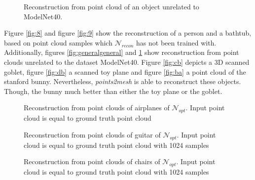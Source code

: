 \begin{figure}[htbp]
  \centering
  \caption{Reconstruction from point cloud of an object unrelated to ModelNet40.} \label{fig:bunny}
\end{figure}
  Figure \ref{fig:8} and figure \ref{fig:9} show the reconstruction of a person and a bathtub, based on point cloud samples 
  which $\mathcal{N}_{recon}$ has not been trained with. Additionally, figures \ref{fig:generalgeneral} and \ref{fig:bunny} show
  reconstruction from point clouds unrelated to the dataset ModelNet40. Figure \ref{fig:cb} depicts a 3D scanned goblet, figure \ref{fig:db} a scanned
  toy plane and figure \ref{fig:ba} a point cloud of the stanford bunny. Nevertheless, \emph{points2mesh} is able to reconstruct these objects. Though, the bunny much
  better than either the toy plane or the goblet.
\begin{figure}[htbp]
 \centering
  \caption{Reconstruction from point clouds of airplanes of $\mathcal{N}_{opt}$. Input point cloud is equal to ground truth point cloud} \label{fig:12}
\end{figure}
\begin{figure}[htbp]
  \centering
  \caption{Reconstruction from point clouds of guitar of $\mathcal{N}_{opt}$. Input point cloud is equal to ground truth point cloud with 1024 samples} \label{fig:11}
\end{figure}
\begin{figure}[htbp]
  \centering
  \caption{Reconstruction from point clouds of chairs of $\mathcal{N}_{opt}$. Input point cloud is equal to ground truth point cloud with 1024 samples} \label{fig:10}
\end{figure}

